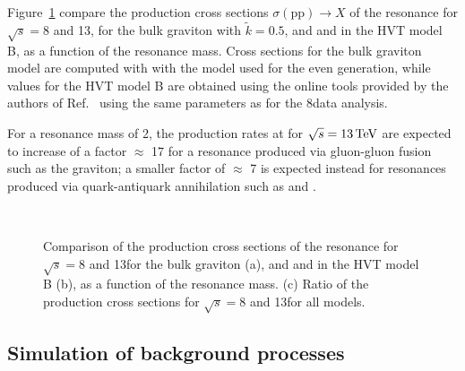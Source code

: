 Figure~\ref{fig:allmodelsXsec} compare the production cross sections $\sigma(\mathrm{pp}) \to X$ of the resonance for $\sqrt{s} = 8$ and 13\TeV,
for the bulk graviton with $\tilde{k} = 0.5$, and \Wpr and \Zpr in the HVT model B, as a function of the resonance mass.
Cross sections for the bulk graviton model are computed with \MADGRAPH{} with the model used for the even generation,
while values for the HVT model B are obtained using the online tools provided by the authors of Ref.~\cite{Pappadopulo:2014qza}
using the same parameters as for the 8\TeV data analysis.

For a resonance mass of 2\TeV, the production rates at for $\sqrt{s} = 13\,\text{Te\hspace{-.08em}V}$ are expected to increase of a factor $\approx$ 17 
for a resonance produced via gluon-gluon fusion such as the graviton; a smaller factor of $\approx$ 7 is expected instead
for resonances produced via quark-antiquark annihilation such as \Wpr and \Zpr.

\begin{figure}[!htb]
\centering
{}
\\
\caption{Comparison of the production cross sections of the resonance for $\sqrt{s} = 8$ and 13\TeV for the bulk graviton (a), and \Wpr and \Zpr in the HVT model B (b), as a function of the resonance mass.
(c) Ratio of the production cross sections for $\sqrt{s} = 8$ and 13\TeV for all models.}
\label{fig:allmodelsXsec}
\end{figure}

\subsection{Simulation of background processes}\label{subsec:bkgMC}

